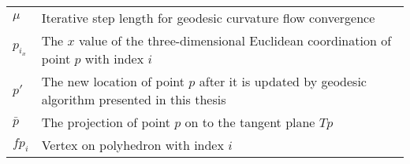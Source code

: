 \begin{longtable}{ m{20mm}|m{90mm} }
  $\mu$ & Iterative step length for geodesic curvature flow convergence \\
  $p_{i_{x}}$ & The $x$ value of the three-dimensional Euclidean coordination of point $p$ with index $i$ \\
  $p'$ & The new location of point $p$ after it is updated by geodesic algorithm presented in this thesis \\
  $\bar{p}$ & The projection of point $p$ on to the tangent plane $T{p}$ \\
  $fp_{i}$ & Vertex on polyhedron with index $i$\\
\end{longtable}


\ifx\isEmbedded\undefined


\pagebreak

\fi






